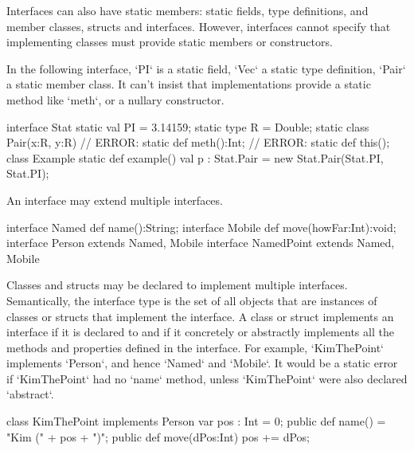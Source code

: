 Interfaces can also have static members: static fields, type
definitions, and member classes, structs and interfaces.  However,
interfaces cannot specify that implementing classes must provide
static members or constructors.

\begin{ex}
In the following interface, \xcd`PI` is a static field, 
\xcd`Vec` a static type definition, 
\xcd`Pair` a static member class.
It can't insist that implementations provide a static method 
like \xcd`meth`, or a nullary constructor.
\begin{xten}
interface Stat {
  static val PI = 3.14159; 
  static type R = Double;
  static class Pair(x:R, y:R) {}
  // ERROR: static def meth():Int;
  // ERROR: static def this();
}
class Example {
  static def example() {
     val p : Stat.Pair = new Stat.Pair(Stat.PI, Stat.PI);
  }
}
\end{xten}
%

\end{ex}

An interface may extend multiple interfaces.  
\begin{xten}
interface Named {
  def name():String;
}
interface Mobile {
  def move(howFar:Int):void;
}
interface Person extends Named, Mobile {}
interface NamedPoint extends Named, Mobile {} 
\end{xten}
%


Classes and structs may be declared to implement multiple interfaces. Semantically, the
interface type is the set of all objects that are instances of classes
or structs that
implement the interface. A class or struct implements an interface if it is declared to
and if it concretely or abstractly implements all the methods and properties
defined in the interface. For example, \xcd`KimThePoint` implements
\xcd`Person`, and hence \xcd`Named` and \xcd`Mobile`. It would be a static
error if \xcd`KimThePoint` had no \xcd`name` method, unless \xcd`KimThePoint` were also
declared \xcd`abstract`.

\begin{xten}
class KimThePoint implements Person {
   var pos : Int = 0;
   public def name() = "Kim (" + pos + ")";
   public def move(dPos:Int) { pos += dPos; }
}
\end{xten}
%


